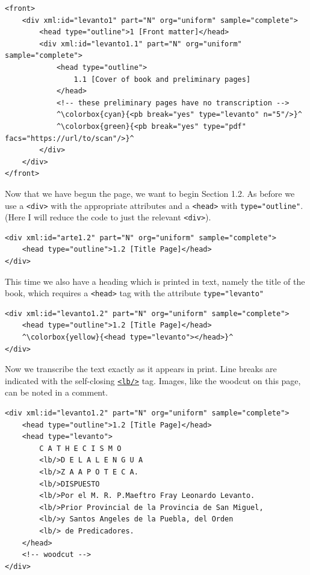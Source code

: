 \documentclass[12pt,a4paper]{article}
\begin{document}
\begin{lstlisting}
<front>
	<div xml:id="levanto1" part="N" org="uniform" sample="complete">
		<head type="outline">1 [Front matter]</head>
		<div xml:id="levanto1.1" part="N" org="uniform" sample="complete">
			<head type="outline">
				1.1 [Cover of book and preliminary pages]
			</head>
			<!-- these preliminary pages have no transcription -->
			^\colorbox{cyan}{<pb break="yes" type="levanto" n="5"/>}^    
			^\colorbox{green}{<pb break="yes" type="pdf" facs="https://url/to/scan"/>}^
		</div>
	</div>
</front>
\end{lstlisting}

Now that we have begun the page, we want to begin Section 1.2.  As before we use a \texttt{<div>} with the appropriate attributes and a \texttt{<head>} with \texttt{type="outline"}.  (Here I will reduce the code to just the relevant \texttt{<div>}).

\begin{lstlisting}[escapechar=^]
<div xml:id="arte1.2" part="N" org="uniform" sample="complete">
	<head type="outline">1.2 [Title Page]</head>
</div>
\end{lstlisting}

This time we also have a heading which is printed in text, namely the title of the book, which requires a \texttt{<head>} tag with the attribute \texttt{type="levanto"}

\begin{lstlisting}
<div xml:id="levanto1.2" part="N" org="uniform" sample="complete">
	<head type="outline">1.2 [Title Page]</head>  
	^\colorbox{yellow}{<head type="levanto"></head>}^
</div>
\end{lstlisting}

Now we transcribe the text exactly as it appears in print.  Line breaks are indicated with the self-closing \hyperref[tag-sec:lb]{\texttt{<lb/>}} tag.  Images, like the woodcut on this page, can be noted in a comment.

\begin{lstlisting}
<div xml:id="levanto1.2" part="N" org="uniform" sample="complete">
	<head type="outline">1.2 [Title Page]</head>  
	<head type="levanto">
		C A T H E C I S M O
		<lb/>D E L A L E N G U A
		<lb/>Z A A P O T E C A.
		<lb/>DISPUESTO
		<lb/>Por el M. R. P.Maeftro Fray Leonardo Levanto.
		<lb/>Prior Provincial de la Provincia de San Miguel,
		<lb/>y Santos Angeles de la Puebla, del Orden
		<lb/> de Predicadores.
	</head>
	<!-- woodcut -->
</div>
\end{lstlisting}
\end{document}
